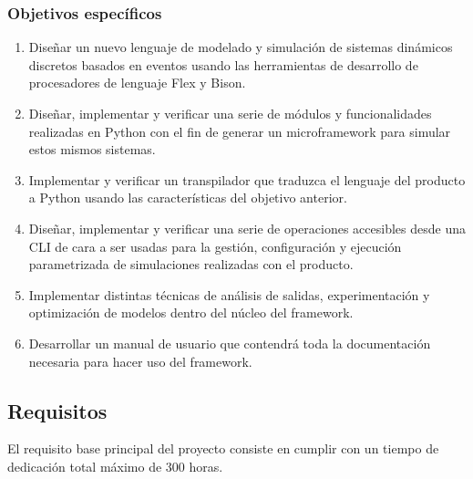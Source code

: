 \subsubsection{Objetivos específicos}
\begin{enumerate}
    \item Diseñar un nuevo lenguaje de modelado y simulación de sistemas
    dinámicos discretos basados en eventos usando las herramientas de desarrollo
    de procesadores de lenguaje Flex y Bison.
    \item Diseñar, implementar y verificar una serie de módulos y
    funcionalidades realizadas en Python con el fin de generar un microframework
    para simular estos mismos sistemas.
    \item Implementar y verificar un transpilador que traduzca el lenguaje del
    producto a Python usando las características del objetivo anterior.
    \item Diseñar, implementar y verificar una serie de operaciones accesibles
    desde una CLI de cara a ser usadas para la gestión, configuración y
    ejecución parametrizada de simulaciones realizadas con el producto.
    \item Implementar distintas técnicas de análisis de salidas, experimentación
    y optimización de modelos dentro del núcleo del framework.
    \item Desarrollar un manual de usuario que contendrá toda la documentación
    necesaria para hacer uso del framework.
\end{enumerate}




\subsection{Requisitos}\label{subsec:requisitos}
El requisito base principal del proyecto consiste en cumplir con un tiempo de
dedicación total máximo de 300 horas.


